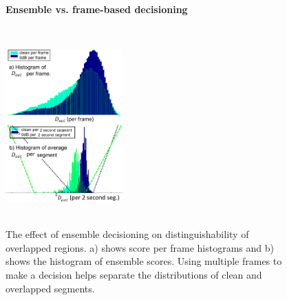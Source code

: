 {\begin{figure}[h!]
	\centering
	\vspace{0mm}
	\textbf{Ensemble vs. frame-based decisioning}\par\medskip	
	\includegraphics[height = 3in, width=0.4\textwidth]{figures/compare_pframe_pseg_hists}
	\vspace{-1mm}
	\caption{The effect of ensemble decisioning on distinguishability of overlapped regions. a) shows score per frame histograms and b) shows the histogram of ensemble scores. Using multiple frames to make a decision helps separate the distributions of clean and overlapped segments.}
	\vspace{-2mm}
	\label{fig:compare_perframe_and_perfile_ovldethist}
\end{figure}

}

